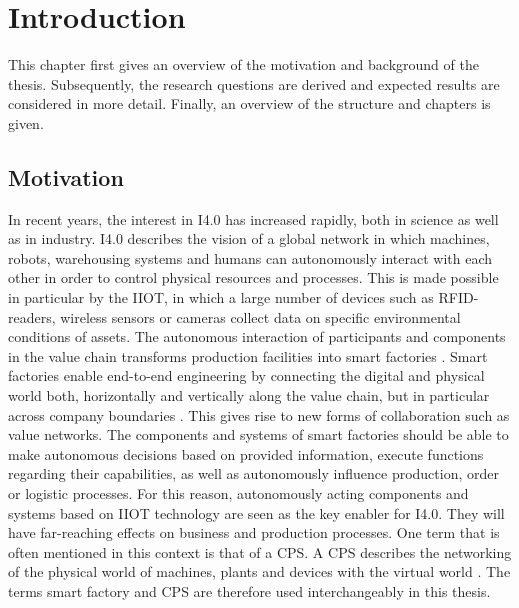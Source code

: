 \chapter{Introduction} \label{chap:introduction}
This chapter first gives an overview of the motivation and background of the thesis. Subsequently, the research questions are derived and expected results are considered in more detail. Finally, an overview of the structure and chapters is given.

\section{Motivation}
In recent years, the interest in \ac{I4.0} has increased rapidly, both in science as well as in industry. \ac{I4.0} describes the vision of a global network in which machines, robots, warehousing systems and humans can autonomously interact with each other in order to control physical resources and processes. This is made possible in particular by the \ac{IIOT}, in which a large number of devices such as RFID-readers, wireless sensors or cameras collect data on specific environmental conditions of assets. The autonomous interaction of participants and components in the value chain transforms production facilities into smart factories \cite[p.20]{Acatech2013Recommendations4.0}. Smart factories enable end-to-end engineering by connecting the digital and physical world both, horizontally and vertically along the value chain, but in particular across company boundaries \cite[p.859]{Uslander2015ReferenceApproach}. This gives rise to new forms of collaboration such as value networks. The components and systems of smart factories should be able to make autonomous decisions based on provided information, execute functions regarding their capabilities, as well as autonomously influence production, order or logistic processes. For this reason, autonomously acting components and systems based on \ac{IIOT} technology are seen as the key enabler for \ac{I4.0}. They will have far-reaching effects on business and production processes. One term that is often mentioned in this context is that of a \ac{CPS}. A \ac{CPS} describes the networking of the physical world of machines, plants and devices with the virtual world \cite{Lee2008CyberBerkeley}. The terms smart factory and \ac{CPS} are therefore used interchangeably in this thesis.

